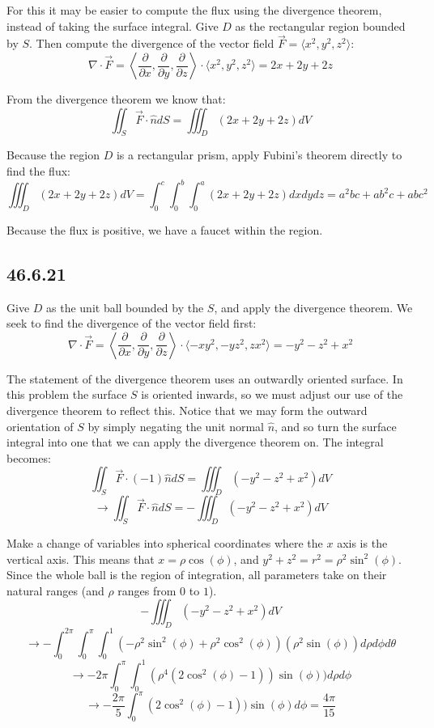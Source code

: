 \documentclass{article}
\begin{document}
For this it may be easier to compute the flux using the divergence theorem, instead of taking the surface integral. Give $D$ as the rectangular region bounded by $S$. Then compute the divergence of the vector field $\vec{F} = \langle x^2,y^2,z^2\rangle$:
$$\nabla \cdot \vec{F} = \left\langle \frac{\partial}{\partial x}, \frac{\partial}{\partial y} ,\frac{\partial}{\partial z} \right\rangle \cdot  \langle x^2,y^2,z^2\rangle  = 2x+2y+2z$$

From the divergence theorem we know that: $$\iint_S \vec{F}\cdot \hat{n}dS = \iiint_D (2x+2y+2z) dV$$

Because the region $D$ is a rectangular prism, apply Fubini's theorem directly to find the flux:
$$\iiint_D (2x+2y+2z) dV = \int_0^c\int_0^b\int_0^a (2x+2y+2z)dxdydz = a^2bc+ab^2c+abc^2$$

Because the flux is positive, we have a faucet within the region.

\subsection{46.6.21}

Give $D$ as the unit ball bounded by the $S$, and apply the divergence theorem. We seek to find the divergence of the vector field first:
$$\nabla\cdot\vec{F} = \left\langle \frac{\partial}{\partial x}, \frac{\partial}{\partial y} ,\frac{\partial}{\partial z} \right\rangle \cdot \langle -xy^2, -yz^2, zx^2 \rangle= -y^2 -z^2 + x^2$$

The statement of the divergence theorem uses an outwardly oriented surface. In this problem the surface $S$ is oriented inwards, so we must adjust our use of the divergence theorem to reflect this. Notice that we may form the outward orientation of $S$ by simply negating the unit normal $\hat{n}$, and so turn the surface integral into one that we can apply the divergence theorem on. The integral becomes:
$$\iint_S \vec{F}\cdot (-1)\hat{n}dS = \iiint_D (-y^2 -z^2 + x^2)dV$$
$$\to \iint_S \vec{F}\cdot \hat{n}dS = -\iiint_D (-y^2 -z^2 + x^2)dV$$

Make a change of variables into spherical coordinates where the $x$ axis is the vertical axis. This means that $x = \rho\cos(\phi)$, and $y^2+z^2=r^2 = \rho^2\sin^2(\phi)$. Since the whole ball is the region of integration, all parameters take on their natural ranges (and $\rho$ ranges from $0$ to $1$).
$$-\iiint_D (-y^2 -z^2 + x^2)dV $$
$$\to -\int_0^{2\pi}\int_0^{\pi}\int_0^1(-\rho^2\sin^2(\phi) + \rho^2\cos^2(\phi))(\rho^2\sin(\phi))d\rho d\phi d\theta$$
$$\to -2\pi\int_0^{\pi}\int_0^1(\rho^4(2\cos^2(\phi)-1))\sin(\phi))d\rho d\phi$$
$$ \to -\frac{2\pi}{5}\int_0^{\pi}(2\cos^2(\phi)-1))\sin(\phi)d\phi = \frac{4\pi}{15}$$
\end{document}
